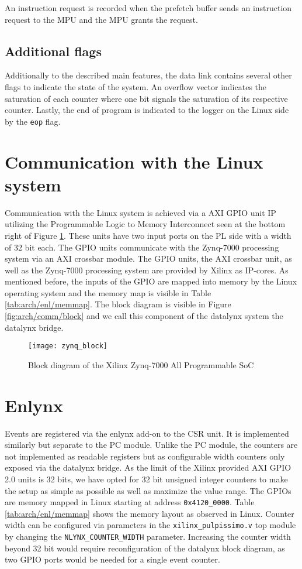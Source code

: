 \documentclass[../bachelor_paper.tex]{subfiles}
\begin{document}
An instruction request is recorded when the prefetch buffer sends an instruction request to the \ac{MPU} and the \ac{MPU} grants the request.

\subsection{Additional flags}
Additionally to the described main features, the data link contains several other flags to indicate the state of the system. An overflow vector indicates the saturation of each counter where one bit signals the saturation of its respective counter. Lastly, the end of program is indicated to the logger on the Linux side by the \texttt{eop} flag.

\section{Communication with the Linux system}
Communication with the Linux system is achieved via a AXI GPIO unit \ac{IP} utilizing the Programmable Logic to Memory Interconnect seen at the bottom right of Figure \ref{fig:arch/comm/zynq}. These units have two input ports on the \ac{PL} side with a width of 32 bit each. The GPIO units communicate with the Zynq-7000 processing system via an AXI crossbar module. The GPIO units, the AXI crossbar unit, as well as the Zynq-7000 processing system are provided by Xilinx as \ac{IP}-cores. As mentioned before, the inputs of the GPIO are mapped into memory by the Linux operating system and the memory map is visible in Table \ref{tab:arch/enl/memmap}. The block diagram is visible in Figure \ref{fig:arch/comm/block} and we call this component of the datalynx system the datalynx bridge.

\begin{figure}
    \centering
    \texttt{[image: zynq\_block]}
    \caption{Block diagram of the Xilinx\textsuperscript{\textregistered} Zynq\textsuperscript{\textregistered}-7000 All Programmable \ac{SoC}}
    \label{fig:arch/comm/zynq}
\end{figure}

\section{Enlynx}
    \label{sec:arch/enlynx}
Events are registered via the enlynx add-on to the \ac{CSR} unit. It is implemented similarly but separate to the \ac{PC} module. Unlike the \ac{PC} module, the counters are not implemented as readable registers but as configurable width counters only exposed via the datalynx bridge. As the limit of the Xilinx provided AXI GPIO 2.0 units is 32 bits, we have opted for 32 bit unsigned integer counters to make the setup as simple as possible as well as maximize the value range. The GPIOs are memory mapped in Linux starting at address \texttt{0x4120\_0000}. Table \ref{tab:arch/enl/memmap} shows the memory layout as observed in Linux. Counter width can be configured via parameters in the \texttt{xilinx\_pulpissimo.v} top module by changing the \texttt{NLYNX\_COUNTER\_WIDTH} parameter. Increasing the counter width beyond 32 bit would require reconfiguration of the datalynx block diagram, as two GPIO ports would be needed for a single event counter.
\end{document}
